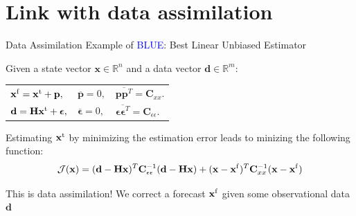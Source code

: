 \documentclass[handout]{beamer}
\begin{document}
\section{Link with data assimilation}
\begin{frame}{Data Assimilation}
   Example of \textcolor{blue}{BLUE}{: Best Linear Unbiased Estimator}
    
    Given a state vector $\mathbf{x}\in \mathbb{R}^n$ and a data vector  $\mathbf{d}\in \mathbb{R}^m$:
\begin{tabular}{p{}p{}p{}}
    $\mathbf{x}^{\rm f} = \mathbf{x}^{\rm t} + \mathbf{p},$ & $\overline{\mathbf{p}}=0,$ &$ \overline{\mathbf{p}\mathbf{p}^T} = \mathbf{C}_{xx}.$\\
    $\mathbf{d} = \mathbf{H}\mathbf{x}^{\rm t} + \boldsymbol{\epsilon},$ & $\overline{\boldsymbol{\epsilon}}=0,$ & $ \overline{\boldsymbol{\epsilon}\boldsymbol{\epsilon}^T} = \mathbf{C}_{\epsilon \epsilon}.$
    
    \end{tabular}
    \pause
    Estimating $\mathbf{x}^{\rm t}$ by minimizing the estimation error leads to minizing the following function:
    \begin{equation*}
        \mathcal{J}(\mathbf{x}) = 
          (\mathbf{d} - \mathbf{H}\mathbf{x})^T  \mathbf{C}_{\epsilon \epsilon}^{-1}  (\mathbf{d} - \mathbf{H}\mathbf{x}) + (\mathbf{x} - \mathbf{x}^{\rm f})^T \mathbf{C}^{-1}_{xx}(\mathbf{x} - \mathbf{x}^{\rm f})
    \end{equation*}
    \pause
    \begin{alertblock}{This is data assimilation!}
    We correct a forecast $\mathbf{x}^{\rm f}$ given some observational data $\mathbf{d}$
    \end{alertblock}
\end{frame}
\end{document}
